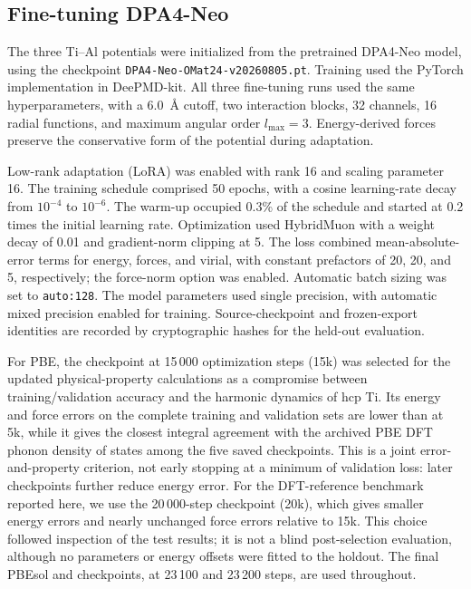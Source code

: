\subsection{Fine-tuning DPA4-Neo}
\label{sec:finetuning}

The three Ti--Al potentials were initialized from the pretrained DPA4-Neo model,\cite{Li2026DPA4} using the checkpoint \texttt{DPA4-Neo-OMat24-v20260805.pt}.
Training used the PyTorch implementation in DeePMD-kit.
All three fine-tuning runs used the same hyperparameters, with a 6.0~\AA{} cutoff, two interaction blocks, 32 channels, 16 radial functions, and maximum angular order $l_{\max}=3$.
Energy-derived forces preserve the conservative form of the potential during adaptation.

Low-rank adaptation (LoRA)\cite{Hu2021} was enabled with rank 16 and scaling parameter 16.
The training schedule comprised 50 epochs, with a cosine learning-rate decay from $10^{-4}$ to $10^{-6}$.
The warm-up occupied 0.3\% of the schedule and started at 0.2 times the initial learning rate.
Optimization used HybridMuon with a weight decay of 0.01 and gradient-norm clipping at 5.
The loss combined mean-absolute-error terms for energy, forces, and virial, with constant prefactors of 20, 20, and 5, respectively; the force-norm option was enabled.
Automatic batch sizing was set to \texttt{auto:128}.
The model parameters used single precision, with automatic mixed precision enabled for training.
Source-checkpoint and frozen-export identities are recorded by cryptographic hashes for the held-out evaluation.

For PBE, the checkpoint at 15\,000 optimization steps (15k) was selected for the updated physical-property calculations as a compromise between training/validation accuracy and the harmonic dynamics of hcp Ti.
Its energy and force errors on the complete training and validation sets are lower than at 5k, while it gives the closest integral agreement with the archived PBE DFT phonon density of states among the five saved checkpoints.
This is a joint error-and-property criterion, not early stopping at a minimum of validation loss: later checkpoints further reduce energy error.
For the DFT-reference benchmark reported here, we use the 20\,000-step checkpoint (20k), which gives smaller energy errors and nearly unchanged force errors relative to 15k.
This choice followed inspection of the test results; it is not a blind post-selection evaluation, although no parameters or energy offsets were fitted to the holdout.
The final PBEsol and \rscan{} checkpoints, at 23\,100 and 23\,200 steps, are used throughout.

